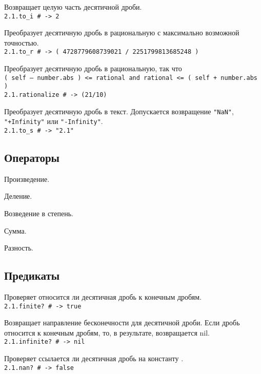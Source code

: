 \begin{methodlist}

  Возвращает целую часть десятичной дроби.
  \\\verb!2.1.to_i # -> 2!

  Преобразует десятичную дробь в рациональную с максимально возможной точностью.
  \\\verb!2.1.to_r # -> ( 4728779608739021 / 2251799813685248 )!

  Преобразует десятичную дробь в рациональную, так что 
  \\\verb!( self – number.abs ) <= rational and rational <= ( self + number.abs )!
  \\\verb!2.1.rationalize # -> (21/10)!

  Преобразует десятичную дробь в текст. Допускается возвращение \verb!"NaN"!, \verb!"+Infinity"! или \verb!"-Infinity"!.
  \\\verb!2.1.to_s # -> "2.1"!
\end{methodlist}

\subsection*{Операторы}

\begin{methodlist}
  Произведение.

  Деление.

  Возведение в степень.

  Сумма.

  Разность.
\end{methodlist}

\subsection*{Предикаты}

\begin{methodlist}
  Проверяет относится ли десятичная дробь к конечным дробям.
  \\\verb!2.1.finite? # -> true!

  Возвращает направление бесконечности для десятичной дроби. Если дробь относится к конечным дробям, то, в результате, возвращается nil.
  \\\verb!2.1.infinite? # -> nil!

  Проверяет ссылается ли десятичная дробь на константу .
  \\\verb!2.1.nan? # -> false!
\end{methodlist}

